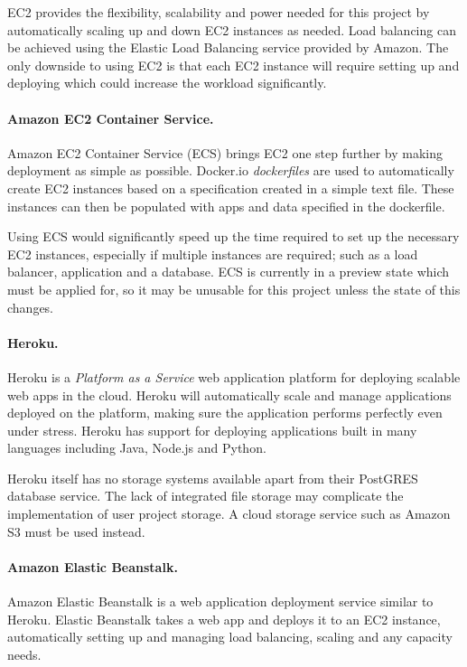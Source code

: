 \documentclass[a4paper, 12pt]{article}
\begin{document}
EC2 provides the flexibility, scalability and power needed for this project by automatically scaling up and down EC2 instances as needed.\cite{awsec2} Load balancing can be achieved using the Elastic Load Balancing service provided by Amazon.\cite{elasticloadbalancing} The only downside to using EC2 is that each EC2 instance will require setting up and deploying which could increase the workload significantly.

\paragraph{Amazon EC2 Container Service.}
Amazon EC2 Container Service (ECS) brings EC2 one step further by making deployment as simple as possible. Docker.io \emph{dockerfiles} are used to automatically create EC2 instances based on a specification created in a simple text file.\cite{awsecs} These instances can then be populated with apps and data specified in the dockerfile.\cite{dockerfile}

Using ECS would significantly speed up the time required to set up the necessary EC2 instances, especially if multiple instances are required; such as a load balancer, application and a database. ECS is currently in a preview state which must be applied for, so it may be unusable for this project unless the state of this changes.

\paragraph{Heroku.}
Heroku is a \emph{Platform as a Service} web application platform for deploying scalable web apps in the cloud. Heroku will automatically scale and manage applications deployed on the platform, making sure the application performs perfectly even under stress.\cite{heroku} Heroku has support for deploying applications built in many languages including Java, Node.js and Python.

Heroku itself has no storage systems available apart from their PostGRES database service. The lack of integrated file storage may complicate the implementation of user project storage. A cloud storage service such as Amazon S3 must be used instead.

\paragraph{Amazon Elastic Beanstalk.}
Amazon Elastic Beanstalk is a web application deployment service similar to Heroku. Elastic Beanstalk takes a web app and deploys it to an EC2 instance, automatically setting up and managing load balancing, scaling and any capacity needs.\cite{awselasticbeanstalk}
\end{document}

